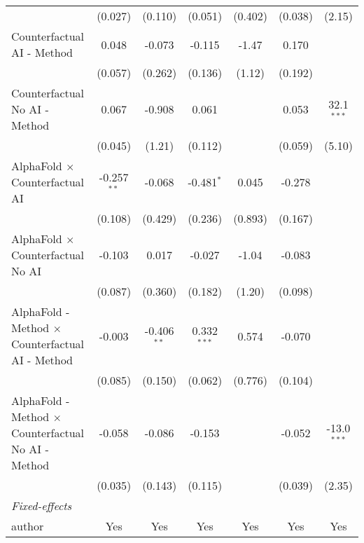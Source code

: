 \begin{tabular}{lcccccc}
                                                              & (0.027)       & (0.110)       & (0.051)       & (0.402)     & (0.038)       & (2.15)\\   
   Counterfactual AI - Method                                 & 0.048         & -0.073        & -0.115        & -1.47       & 0.170         &   \\   
                                                              & (0.057)       & (0.262)       & (0.136)       & (1.12)      & (0.192)       &   \\   
   Counterfactual No AI - Method                              & 0.067         & -0.908        & 0.061         &             & 0.053         & 32.1$^{***}$\\   
                                                              & (0.045)       & (1.21)        & (0.112)       &             & (0.059)       & (5.10)\\   
   AlphaFold $\times$ Counterfactual AI                       & -0.257$^{**}$ & -0.068        & -0.481$^{*}$  & 0.045       & -0.278        &   \\   
                                                              & (0.108)       & (0.429)       & (0.236)       & (0.893)     & (0.167)       &   \\   
   AlphaFold $\times$ Counterfactual No AI                    & -0.103        & 0.017         & -0.027        & -1.04       & -0.083        &   \\   
                                                              & (0.087)       & (0.360)       & (0.182)       & (1.20)      & (0.098)       &   \\   
   AlphaFold - Method $\times$ Counterfactual AI - Method     & -0.003        & -0.406$^{**}$ & 0.332$^{***}$ & 0.574       & -0.070        &   \\   
                                                              & (0.085)       & (0.150)       & (0.062)       & (0.776)     & (0.104)       &   \\   
   AlphaFold - Method $\times$ Counterfactual No AI - Method  & -0.058        & -0.086        & -0.153        &             & -0.052        & -13.0$^{***}$\\   
                                                              & (0.035)       & (0.143)       & (0.115)       &             & (0.039)       & (2.35)\\   
   \midrule
   \emph{Fixed-effects}\\
   author                                                     & Yes           & Yes           & Yes           & Yes         & Yes           & Yes\\  

\end{tabular}
